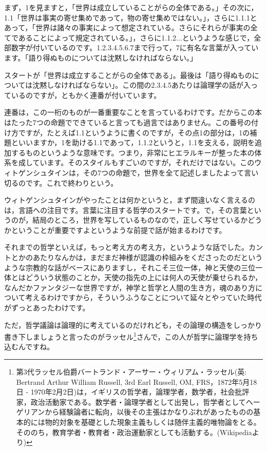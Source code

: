 \documentclass{ltjsbook}
\begin{document}
まず，1を見ますと，「世界は成立していることがらの全体である。」その次に，1.1「世界は事実の寄せ集めであって，物の寄せ集めではない。」，さらに1.1.1とあって，「世界は諸々の事実によって想定されている。さらにそれらが事実の全てであることによって規定されている。」，さらに1.1.2...というような感じで，全部数字が付いているのです。1.2.3.4.5.6.7まで行って，7に有名な言葉が入っています。「語り得ぬものについては沈黙しなければならない。」

スタートが「世界は成立することがらの全体である」。最後は「語り得ぬものについては沈黙しなければならない」。この間の2.3.4.5あたりは論理学の話が入っているのですが，ともかく連番が付いています。

連番は，この一桁のものが一番重要なことを言っているわけです。だからこの本はたった7つの命題でできていると言っても過言ではありません。この番号の付け方ですが，たとえば1.1というように書くのですが，その点1の部分は，1の補題といいますか，1を助ける1.1であって，1.1.2というと，1.1を支える，説明を追加するものというような意味です。つまり，非常にヒエラルキーが整った本の体系を成しています。そのスタイルもすごいのですが，それだけではない。このウィトゲンシュタインは，その7つの命題で，世界を全て記述しましたよって言い切るのです。これで終わりという。

ウィトゲンシュタインがやったことは何かというと，まず間違いなく言えるのは，言語への注目です。言葉に注目する哲学のスタートです。で，その言葉というのが，結局のところ，世界を写しているものなので，正しく写せているかどうかということが重要ですよというような前提で話が始まるわけです。

それまでの哲学といえば，もっと考え方の考え方，というような話でした。カントとかのあたりなんかは，まだまだ神様が認識の枠組みをくださったのだというような宗教的な話がベースにありますし，それこそ三位一体，神と天使の三位一体とはどういう状態のことか，天使の指先の上には何人の天使が乗せられるか，なんだかファンタジーな世界ですが，神学と哲学と人間の生き方，魂のあり方について考えるわけですから，そういうふうなことについて延々とやっていた時代がずっとあったわけです。

ただ，哲学議論は論理的に考えているのだけれども，その論理の構造をしっかり書き下しましょうと言ったのがラッセル\footnote{第3代ラッセル伯爵バートランド・アーサー・ウィリアム・ラッセル(英: Bertrand Arthur William Russell, 3rd Earl Russell, OM, FRS，1872年5月18日 - 1970年2月2日)は，イギリスの哲学者，論理学者，数学者，社会批評家，政治活動家である。数学者・論理学者として出発し，哲学者としてヘーゲリアンから経験論者に転向，以後その主張はかなりぶれがあったものの基本的には物的対象を基礎とした現象主義もしくは随伴主義的唯物論をとる。そののち，教育学者・教育者・政治運動家としても活動する。(Wikipediaより)}さんで，この人が哲学に論理学を持ち込むんですね。
\end{document}
